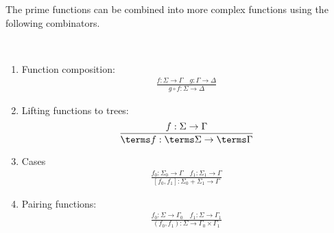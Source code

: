 \begin{definition}
\begin{enumerate}

\end{enumerate}
\end{definition}



The prime functions can be combined into more complex functions using the following combinators.
\begin{definition}
     [Combinators] \label{def:combinators} \ 
    \begin{enumerate}
    \item Function composition:
    \begin{align*}
    \frac{f : \Sigma \to \Gamma \quad g : \Gamma \to \Delta} {g \circ f : \Sigma \to \Delta}
\end{align*}

\item Lifting functions to trees:
\begin{align*}
    \frac{f : \Sigma \to \Gamma} {\terms f : \terms \Sigma \to \terms \Gamma}
\end{align*}
\item Cases
\begin{align*}
    \frac{f_0 : \Sigma_0 \to \Gamma \quad f_1 : \Sigma_1 \to \Gamma} {[f_0,f_1] : \Sigma_0 + \Sigma_1 \to \Gamma}
\end{align*}

\item Pairing functions:
\begin{align*}
    \frac{f_0 : \Sigma \to \Gamma_0 \quad f_1 : \Sigma \to \Gamma_1} {(f_0,f_1) : \Sigma \to \Gamma_0 \times \Gamma_1}
\end{align*}

\end{enumerate}
\end{definition}

